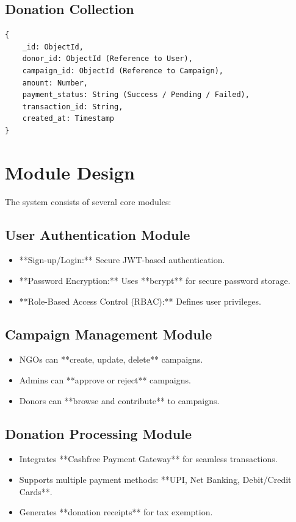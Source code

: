 \subsection{Donation Collection}
\begin{verbatim}
{
    _id: ObjectId,
    donor_id: ObjectId (Reference to User),
    campaign_id: ObjectId (Reference to Campaign),
    amount: Number,
    payment_status: String (Success / Pending / Failed),
    transaction_id: String,
    created_at: Timestamp
}
\end{verbatim}

\section{Module Design}
The system consists of several core modules:

\subsection{User Authentication Module}
\begin{itemize}
    \item **Sign-up/Login:** Secure JWT-based authentication.
    \item **Password Encryption:** Uses **bcrypt** for secure password storage.
    \item **Role-Based Access Control (RBAC):** Defines user privileges.
\end{itemize}

\subsection{Campaign Management Module}
\begin{itemize}
    \item NGOs can **create, update, delete** campaigns.
    \item Admins can **approve or reject** campaigns.
    \item Donors can **browse and contribute** to campaigns.
\end{itemize}

\subsection{Donation Processing Module}
\begin{itemize}
    \item Integrates **Cashfree Payment Gateway** for seamless transactions.
    \item Supports multiple payment methods: **UPI, Net Banking, Debit/Credit Cards**.
    \item Generates **donation receipts** for tax exemption.
\end{itemize}

